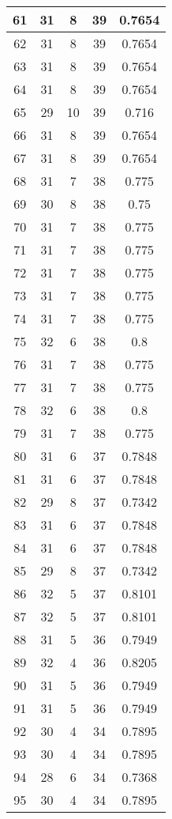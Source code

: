 \documentclass[letterpaper, 12pt]{article}
\begin{document}
\begin{longtable}{|c|c|c|c|c|}
61 & 31 & 8 & 39 & 0.7654 \\
\hline
62 & 31 & 8 & 39 & 0.7654 \\
\hline
63 & 31 & 8 & 39 & 0.7654 \\
\hline
64 & 31 & 8 & 39 & 0.7654 \\
\hline
65 & 29 & 10 & 39 & 0.716 \\
\hline
66 & 31 & 8 & 39 & 0.7654 \\
\hline
67 & 31 & 8 & 39 & 0.7654 \\
\hline
68 & 31 & 7 & 38 & 0.775 \\
\hline
69 & 30 & 8 & 38 & 0.75 \\
\hline
70 & 31 & 7 & 38 & 0.775 \\
\hline
71 & 31 & 7 & 38 & 0.775 \\
\hline
72 & 31 & 7 & 38 & 0.775 \\
\hline
73 & 31 & 7 & 38 & 0.775 \\
\hline
74 & 31 & 7 & 38 & 0.775 \\
\hline
75 & 32 & 6 & 38 & 0.8 \\
\hline
76 & 31 & 7 & 38 & 0.775 \\
\hline
77 & 31 & 7 & 38 & 0.775 \\
\hline
78 & 32 & 6 & 38 & 0.8 \\
\hline
79 & 31 & 7 & 38 & 0.775 \\
\hline
80 & 31 & 6 & 37 & 0.7848 \\
\hline
81 & 31 & 6 & 37 & 0.7848 \\
\hline
82 & 29 & 8 & 37 & 0.7342 \\
\hline
83 & 31 & 6 & 37 & 0.7848 \\
\hline
84 & 31 & 6 & 37 & 0.7848 \\
\hline
85 & 29 & 8 & 37 & 0.7342 \\
\hline
86 & 32 & 5 & 37 & 0.8101 \\
\hline
87 & 32 & 5 & 37 & 0.8101 \\
\hline
88 & 31 & 5 & 36 & 0.7949 \\
\hline
89 & 32 & 4 & 36 & 0.8205 \\
\hline
90 & 31 & 5 & 36 & 0.7949 \\
\hline
91 & 31 & 5 & 36 & 0.7949 \\
\hline
92 & 30 & 4 & 34 & 0.7895 \\
\hline
93 & 30 & 4 & 34 & 0.7895 \\
\hline
94 & 28 & 6 & 34 & 0.7368 \\
\hline
95 & 30 & 4 & 34 & 0.7895 \\

\end{longtable}
\end{document}
